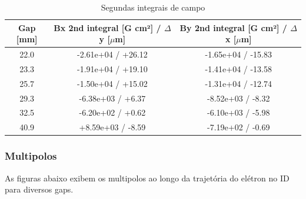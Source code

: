 \documentclass[a4paper,12pt]{article}
\begin{document}
\begin{table}[H]
\centering
\caption{Segundas integrais de campo}
\begin{tabular}{|c|c|c|}
\hline
   Gap [mm] & Bx 2nd integral [G cm²] / $\Delta$ y [$\mu$m] & By 2nd integral [G cm²] / $\Delta$ x [$\mu$m]   \\
\hline
    22.0 & -2.61e+04 / +26.12 & -1.65e+04 / -15.83 \\
    23.3 & -1.91e+04 / +19.10 & -1.41e+04 / -13.58 \\
    25.7 & -1.50e+04 / +15.02 & -1.31e+04 / -12.74 \\
    29.3 & -6.38e+03 / +6.37 & -8.52e+03 / -8.32 \\
    32.5 & -6.20e+02 / +0.62 & -6.10e+03 / -5.98 \\
    40.9 & +8.59e+03 / -8.59 & -7.19e+02 / -0.69 \\
\hline
\end{tabular}
\end{table}

\subsubsection{Multipolos}
As figuras abaixo exibem os multipolos ao longo da trajetória do elétron no ID para diversos gaps.
\end{document}

